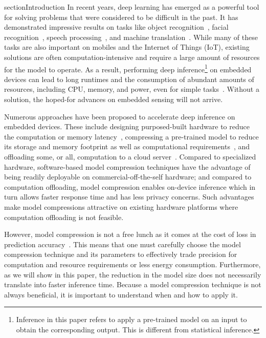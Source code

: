 section{Introduction}
In recent years, deep learning has emerged as a powerful tool for solving problems that were considered to be difficult in the past. It has
demonstrated impressive results on tasks like object recognition~\cite{donahue14,he2016deep}, facial
recognition~\cite{parkhi2015deep,sun2014deep}, speech processing~\cite{pmlrv48amodei16}, and machine translation~\cite{bahdanau2014neural}.
While many of these tasks are also important on mobiles and the Internet of Things (IoT), existing solutions are often
computation-intensive and require a large amount of resources for the model to operate. As a result, performing deep
inference\footnote{Inference in this paper refers to apply a pre-trained model on an input to obtain the corresponding output. This is
different from statistical inference.} on embedded devices can lead to long runtimes and the consumption of abundant amounts of resources,
including CPU, memory, and power, even for simple tasks~\cite{CanzianiPC16}. Without a solution,
 the hoped-for advances on embedded sensing will not arrive.


Numerous approaches have been proposed to accelerate deep inference on embedded devices. These include designing purposed-built hardware to
reduce the computation or memory latency~\cite{}, compressing a pre-trained model to reduce its storage and memory footprint as well as
computational requirements~\cite{}, and offloading some, or all, computation to a cloud
server~\cite{Kang2017neurosurgeon,teerapittayanon2017distributed}. Compared to specialized hardware, software-based model compression
techniques have the advantage of being readily deployable on commercial-off-the-self hardware; and compared to computation offloading,
model compression enables on-device inference which in turn allows faster response time and has less privacy concerns. Such advantages make
model compressions attractive on existing hardware platforms where computation offloading is not feasible.


However, model compression is not a free lunch as it comes at the cost of loss in prediction accuracy~\cite{}. This means that one must
carefully choose the model compression technique and its parameters to effectively trade precision for computation and resource
requirements or less energy consumption. Furthermore, as we will show in this paper, the reduction in the model size does not necessarily
translate into faster inference time. Because a model compression technique is not always beneficial, it is important to understand when
and how to apply it.

